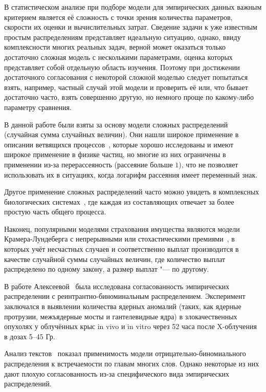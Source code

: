 \documentclass[12pt, specialist, subf, substylefile = spbu.rtx]{disser}
\begin{document}
	\intro
	
	В статистическом анализе при подборе модели для эмпирических данных важным критерием является её сложность с точки зрения количества параметров, скорости их оценки и вычислительных затрат. Сведение задачи к уже известным простым распределениям представляет идеальную ситуацию, однако, ввиду комплексности многих реальных задач, верной может оказаться только достаточно сложная модель с несколькими параметрами, оценка которых представляет собой отдельную область изучения. Поэтому при достижении достаточного согласования с некоторой сложной моделью следует попытаться взять, например, частный случай этой модели и проверить её или, что бывает достаточно часто, взять совершенно другую, но немного проще по какому-либо параметру сравнения.
	
	В данной работе были взяты за основу модели сложных распределений (случайная сумма случайных величин). Они нашли широкое применение в описании ветвящихся процессов~\cite{bib:vatutin2008}, которые хорошо исследованы и имеют широкое применение в физике частиц, но многие из них ограничены в применении из-за перерассеяность (рассеяние больше $ 1 $), что не позволяет использовать их в ситуациях, когда логарифм рассеяния имеет переменный знак.
	
	Другое применение сложных распределений часто можно увидеть в комплексных биологических системах~\cite{bib:alexeeva2013}, где каждая из составляющих отвечает за более простую часть общего процесса.
	
	Наконец, популярными моделями страхования имущества являются модели Крамера-Лундеберга с непрерывными или стохастическими премиями~\cite{bib:boykov2002}, в которых учёт несчастных случаев и соответственно выплат производится в качестве случайной суммы случайных величин, где количество выплат распределено по одному закону, а размер выплат "--- по другому.
	
	В работе Алексеевой~\cite{bib:alexeeva2008} была исследована согласованность эмпирических распределении с реинтрантно-биноминаль\-ным распределением. Эксперимент заключался в выявлении количества ядерных аномалий (таких, как ядерные протрузии, межъядерные мосты и гантелевидные ядра) в злокачественных опухолях у облучённых крыс in vivo и in vitro через 52 часа после X-облучения в дозах 5--45 Гр.
	
	Анализ текстов~\cite{bib:alexeevaeng2013} показал применимость модели отрицательно-биномиального распределения к встречаемости по главам многих слов. Однако некоторые из них дают плохую согласованность из-за специфического вида эмпирических распределений. 
	
\end{document}
